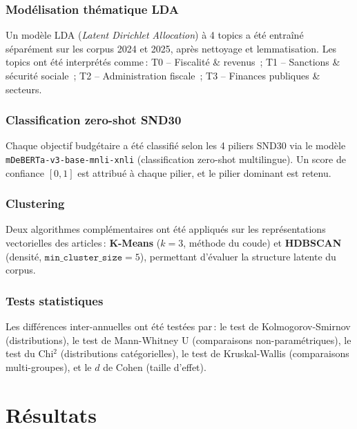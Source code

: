 \documentclass[12pt, a4paper]{article}
\begin{document}
\subsubsection{Modélisation thématique LDA}

Un modèle LDA (\textit{Latent Dirichlet Allocation}) à 4 topics a été entraîné séparément sur 
les corpus 2024 et 2025, après nettoyage et lemmatisation. Les topics ont été interprétés comme\,: 
T0 -- Fiscalité \& revenus~; T1 -- Sanctions \& sécurité sociale~; T2 -- Administration fiscale~; 
T3 -- Finances publiques \& secteurs.

\subsubsection{Classification zero-shot SND30}

Chaque objectif budgétaire a été classifié selon les 4 piliers SND30 via le modèle 
\texttt{mDeBERTa-v3-base-mnli-xnli} (classification zero-shot multilingue). Un score de confiance 
$[0,1]$ est attribué à chaque pilier, et le pilier dominant est retenu.

\subsubsection{Clustering}

Deux algorithmes complémentaires ont été appliqués sur les représentations vectorielles des 
articles\,: \textbf{K-Means} ($k=3$, méthode du coude) et \textbf{HDBSCAN} (densité, 
$\texttt{min\_cluster\_size}=5$), permettant d'évaluer la structure latente du corpus.

\subsubsection{Tests statistiques}

Les différences inter-annuelles ont été testées par\,: le test de Kolmogorov-Smirnov (distributions), 
le test de Mann-Whitney U (comparaisons non-paramétriques), le test du Chi$^2$ (distributions catégorielles), 
le test de Kruskal-Wallis (comparaisons multi-groupes), et le $d$ de Cohen (taille d'effet).

\section{Résultats}
\end{document}
